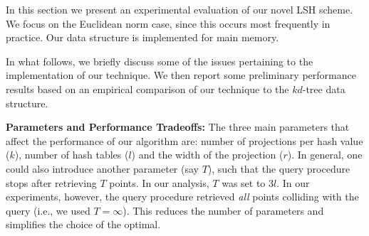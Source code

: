 \documentclass[12pt]{article}
\begin{document}
In this section we present an experimental evaluation of our novel LSH
scheme.  We focus on the Euclidean norm case, since this occurs most
frequently in practice.  Our data structure is implemented for main
memory.  

In what follows, we briefly discuss some of the issues pertaining to the
implementation of our technique.  We then report some preliminary
performance results based on an empirical comparison of our technique to
the $kd$-tree data structure.

{\noindent \bf Parameters and Performance Tradeoffs:} The three
main parameters that affect the performance of our algorithm are:
number of projections per hash value ($k$), number of hash tables
($l$) and the width of the projection ($r$).
In general, one could also introduce another parameter (say $T$),
such that the query procedure stops after retrieving $T$ points.
In our analysis, $T$ was set to $3l$. 
In our experiments, however, the query procedure retrieved {\em all} 
points colliding with the query (i.e., we used $T=\infty$).
This reduces the number of parameters and simplifies the choice of the
optimal.

\end{document}
